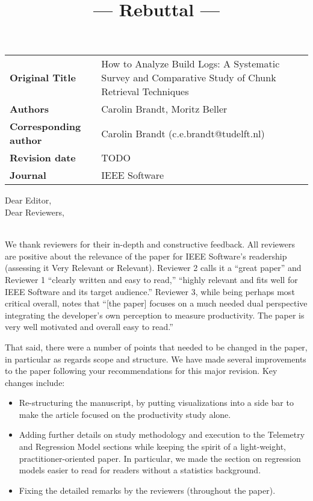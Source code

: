 \documentclass[10pt,a4wide]{article}
\begin{document}
\title{\textbf {--- Rebuttal ---}}

\date{}
\maketitle

\vspace{-1cm}

\begin{tabular}{|lp{11cm}|}
\hline
\textbf{Original Title} & 
How to Analyze Build Logs: A Systematic Survey and Comparative Study of Chunk Retrieval Techniques \\
\textbf{Authors} & Carolin Brandt, Moritz Beller\\
\textbf{Corresponding author} & Carolin Brandt (c.e.brandt@tudelft.nl)\\
\textbf{Revision date} & TODO \\ %
\textbf{Journal} & IEEE Software \\
\hline
\end{tabular}
\vspace{1cm}

\noindent
Dear Editor,\\
Dear Reviewers,
\\\\
\noindent


We thank reviewers for their in-depth and constructive feedback. All reviewers are
positive about the relevance of the paper for IEEE Software’s
readership (assessing it Very Relevant or Relevant). Reviewer 2 calls it a “great paper” and
Reviewer 1 “clearly written and easy to read,” “highly relevant and
fits well for IEEE Software and its target audience.” Reviewer 3,
while being perhaps most critical overall, notes that “[the paper]
focuses on a much needed dual perspective integrating the developer’s
own perception to measure productivity. The paper is very well
motivated and overall easy to read.”

That said, there were a number of points that needed to be changed in the paper, in particular as regards scope and structure. We have made several improvements to
the paper following your recommendations for this major revision.  Key changes include:
\begin{itemize}
\item Re-structuring the manuscript, by putting visualizations into a side bar to make the article focused on the productivity study alone.
  \item Adding further details on study methodology and execution to the Telemetry and Regression Model sections while keeping the spirit of a light-weight, practitioner-oriented paper. In particular, we made the section on regression models easier to read for readers without a statistics background. 
\item Fixing the detailed remarks by the reviewers (throughout the paper).
\end{itemize}
\end{document}
